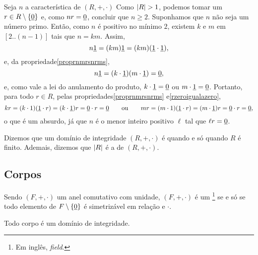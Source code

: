 \begin{dem}
  Seja $n$ a característica de $(R,+,\cdot)$
  Como $\cardi{R}>1$, podemos tomar um $r\in R\setminus\left\{ \underline{0} \right\}$ e,
  como $nr=\underline{0}$, concluir que $n\geq 2$. Suponhamos que $n$ não seja
  um número primo. Então, como $n$ é positivo no mínimo $2$,
  existem $k$ e $m$ em
  $[2..(n-1)]$ tais que $n=km$. Assim,
  \begin{equation*}
    n\underline{1} = (km)\underline{1} = (km)(\underline{1}\cdot\underline{1})\mathrm{,}
  \end{equation*}
  e, da propriedade\xspace\ref{proprnmrsnrms},
  \begin{equation*}
    n\underline{1} = (k\cdot \underline{1})(m\cdot \underline{1}) = \underline{0}\mathrm{,}
  \end{equation*}
  e, como vale a lei do anulamento do produto, $k\cdot \underline{1}=\underline{0}$ ou
  $m\cdot \underline{1}=\underline{0}$. Portanto, para todo $r\in R$, pelas
  propriedades\xspace\ref{proprnmrsnrms} e\xspace\ref{rzeroigualazero},
  \begin{equation*}
    kr = (k\cdot 1)(\underline{1}\cdot r) = (k\cdot\underline{1})r = \underline{0}\cdot r = \underline{0}
    \qquad\text{ou}\qquad
    mr = (m\cdot 1)(\underline{1}\cdot r) = (m\cdot\underline{1})r = \underline{0}\cdot r = \underline{0}
    \mathrm{,}
  \end{equation*}
  o que é um absurdo, já que $n$ é o menor inteiro positivo $\ell$
  tal que $\ell r=\underline{0}$.
\end{dem}

\begin{Nom}
  Dizemos que um domínio de integridade
  $(R,+,\cdot)$ é 
  quando e só quando $R$ é finito. Ademais, dizemos que $\left| R \right|$ é a
   de
  $(R,+,\cdot)$.
\end{Nom}

\subsection{Corpos}

\begin{Def}
  Sendo $(F,+,\cdot)$ um anel comutativo com unidade, $(F,+,\cdot)$ é um
  \footnote{Em inglês,
  \textit{field}.}
  se e só se todo elemento de $F\setminus\left\{ \underline{0} \right\}$ é
  simetrizável em relação e $\cdot$.
\end{Def}

\begin{Teo}\label{teocorpodi}
  Todo corpo é um domínio de integridade.
\end{Teo}

